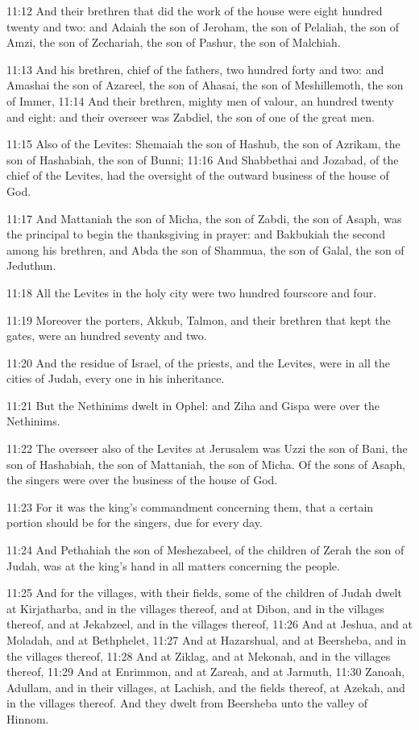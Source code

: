 11:12 And their brethren that did the work of the house were eight hundred twenty and two: and Adaiah the son of Jeroham, the son of Pelaliah, the son of Amzi, the son of Zechariah, the son of Pashur, the son of Malchiah.

11:13 And his brethren, chief of the fathers, two hundred forty and two: and Amashai the son of Azareel, the son of Ahasai, the son of Meshillemoth, the son of Immer, 11:14 And their brethren, mighty men of valour, an hundred twenty and eight: and their overseer was Zabdiel, the son of one of the great men.

11:15 Also of the Levites: Shemaiah the son of Hashub, the son of Azrikam, the son of Hashabiah, the son of Bunni; 11:16 And Shabbethai and Jozabad, of the chief of the Levites, had the oversight of the outward business of the house of God.

11:17 And Mattaniah the son of Micha, the son of Zabdi, the son of Asaph, was the principal to begin the thanksgiving in prayer: and Bakbukiah the second among his brethren, and Abda the son of Shammua, the son of Galal, the son of Jeduthun.

11:18 All the Levites in the holy city were two hundred fourscore and four.

11:19 Moreover the porters, Akkub, Talmon, and their brethren that kept the gates, were an hundred seventy and two.

11:20 And the residue of Israel, of the priests, and the Levites, were in all the cities of Judah, every one in his inheritance.

11:21 But the Nethinims dwelt in Ophel: and Ziha and Gispa were over the Nethinims.

11:22 The overseer also of the Levites at Jerusalem was Uzzi the son of Bani, the son of Hashabiah, the son of Mattaniah, the son of Micha.  Of the sons of Asaph, the singers were over the business of the house of God.

11:23 For it was the king's commandment concerning them, that a certain portion should be for the singers, due for every day.

11:24 And Pethahiah the son of Meshezabeel, of the children of Zerah the son of Judah, was at the king's hand in all matters concerning the people.

11:25 And for the villages, with their fields, some of the children of Judah dwelt at Kirjatharba, and in the villages thereof, and at Dibon, and in the villages thereof, and at Jekabzeel, and in the villages thereof, 11:26 And at Jeshua, and at Moladah, and at Bethphelet, 11:27 And at Hazarshual, and at Beersheba, and in the villages thereof, 11:28 And at Ziklag, and at Mekonah, and in the villages thereof, 11:29 And at Enrimmon, and at Zareah, and at Jarmuth, 11:30 Zanoah, Adullam, and in their villages, at Lachish, and the fields thereof, at Azekah, and in the villages thereof. And they dwelt from Beersheba unto the valley of Hinnom.

